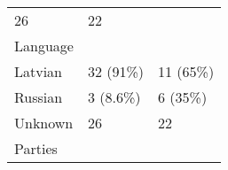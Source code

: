 \documentclass[
]{article}
\begin{document}
\begin{longtable}[]{@{}lll@{}}
\begin{minipage}[t]{0.18\columnwidth}
26\strut
\end{minipage} & \begin{minipage}[t]{0.17\columnwidth}\raggedright
22\strut
\end{minipage}\tabularnewline
\begin{minipage}[t]{0.57\columnwidth}\raggedright
Language\strut
\end{minipage} & \begin{minipage}[t]{0.18\columnwidth}\raggedright
\strut
\end{minipage} & \begin{minipage}[t]{0.17\columnwidth}\raggedright
\strut
\end{minipage}\tabularnewline
\begin{minipage}[t]{0.57\columnwidth}\raggedright
Latvian\strut
\end{minipage} & \begin{minipage}[t]{0.18\columnwidth}\raggedright
32 (91\%)\strut
\end{minipage} & \begin{minipage}[t]{0.17\columnwidth}\raggedright
11 (65\%)\strut
\end{minipage}\tabularnewline
\begin{minipage}[t]{0.57\columnwidth}\raggedright
Russian\strut
\end{minipage} & \begin{minipage}[t]{0.18\columnwidth}\raggedright
3 (8.6\%)\strut
\end{minipage} & \begin{minipage}[t]{0.17\columnwidth}\raggedright
6 (35\%)\strut
\end{minipage}\tabularnewline
\begin{minipage}[t]{0.57\columnwidth}\raggedright
Unknown\strut
\end{minipage} & \begin{minipage}[t]{0.18\columnwidth}\raggedright
26\strut
\end{minipage} & \begin{minipage}[t]{0.17\columnwidth}\raggedright
22\strut
\end{minipage}\tabularnewline
\begin{minipage}[t]{0.57\columnwidth}\raggedright
Parties\strut
\end{minipage} & \begin{minipage}[t]{0.18\columnwidth}\raggedright
\strut
\end{minipage} & \begin{minipage}[t]{0.17\columnwidth}\raggedright

\end{minipage}
\end{longtable}
\end{document}
